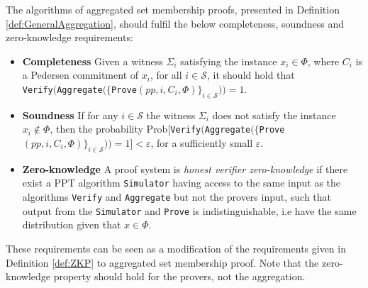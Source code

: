 The algorithms of aggregated set membership proofs, presented in Definition \ref{def:GeneralAggregation}, should fulfil the below completeness, soundness and zero-knowledge requirements:
\begin{itemize}
\item \textbf{Completeness} Given a witness $\Sigma_i$ satisfying the instance $x_i\in\Phi$, where $C_i$ is a Pedersen commitment of $x_i$, for all $i\in\mathcal{S}$, it should hold that
\\
 \texttt{Verify}$($\texttt{Aggregate}$(\{$\texttt{Prove}$(pp,i,C_i,\Phi)\}_{i\in\mathcal{S}}) )= 1$. 
\item \textbf{Soundness} If for any $i\in\mathcal{S}$ the  witness $\Sigma_i$ does not satisfy the  instance $x_i\notin\Phi$, then the probability  Prob$[ $\texttt{Verify}$($\texttt{Aggregate}$(\{$\texttt{Prove}$(pp,i,C_i,\Phi)\}_{i\in\mathcal{S}}) ) = 1] < \varepsilon$, for a sufficiently small $\varepsilon$. 
\item  \textbf{Zero-knowledge} 
A proof system is \textit{honest verifier zero-knowledge} if there exist a PPT algorithm \texttt{Simulator} having access to the same input as the algorithms \texttt{Verify} and \texttt{Aggregate} but not the provers input, such that output from the \texttt{Simulator} and \texttt{Prove} is indistinguishable, i.e have the same distribution given that $x\in\Phi$.  
\end{itemize}

These requirements can be seen as a modification of the requirements given in Definition \ref{def:ZKP} to aggregated set membership proof. Note that the zero-knowledge property should hold for the provers, not the aggregation.



